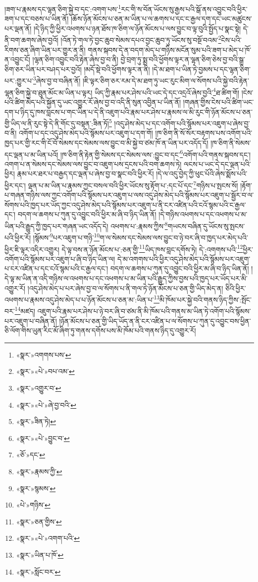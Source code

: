 །ཟག་པ་རྣམས་དང་ལྷན་ཅིག་སྐྱེ་བ་དང་:འགག་པས་\footnote{«སྣར་»འགགས་པས་}རང་གི་ས་བོན་ཡོངས་སུ་རྒྱས་པའི་སྒོ་ནས་འབྱུང་བའི་ཕྱིར་ཟག་པ་དང་བཅས་པ་ཡིན་ནོ། །ཆོས་ཉོན་མོངས་པ་ཅན་མ་ཡིན་པ་ལ་ཆགས་པ་དང་ང་རྒྱལ་དག་དང་ཡང་མཚུངས་པར་ལྡན་ནོ། །དེ་ཉིད་ཀྱི་ཕྱིར་འཕགས་པ་ཉན་ཐོས་ཁ་ཅིག་ལ་ཉོན་མོངས་པ་ལས་བྱུང་བ་ལྟ་བུའི་སྤྱོད་པ་སྣང་སྟེ། དེ་ནི་བག་ཆགས་ཞེས་བྱའོ། །འོན་ཏེ་གལ་ཏེ་བྱང་ཆུབ་སེམས་དཔའ་བྱང་ཆུབ་ཏུ་ཡོངས་སུ་བསྔོ་བའམ་\footnote{«སྣར་»«པེ་»བཔ་འམ་}ངེས་པའི་རིགས་ཅན་ཞིག་ཡིན་པར་གྱུར་ན་ནི། གནས་སྐབས་དེ་ན་བདག་མེད་པ་གཉིས་མངོན་སུམ་པའི་ཟག་པ་མེད་པ་ཁོ་ན་འབྱུང་ངོ། །ལྷན་ཅིག་འབྱུང་བའི་རྟེན་ཞེས་བྱ་བ་ནི། བྱེ་བྲག་ཏུ་སྨྲ་བའི་ཕྱོགས་ལྟར་ན་ལྷན་ཅིག་ཅེས་བྱ་བའི་སྒྲ་ཅིག་ཅར་ཡིན་པར་བཤད་པར་བྱའོ། །མདོ་སྡེ་བའི་ཕྱོགས་ལྟར་ན་ནི། །དེ་མ་ཐག་པ་ཡིན་ཏེ་བྱམས་པ་དང་ལྷན་ཅིག་པར་:གྱུར་པ་\footnote{«སྣར་»འགྱུར་བ་}ཞེས་བྱ་བ་བཞིན་ནོ། །ཇི་ལྟར་ཅིག་ཅར་རམ་དེ་མ་ཐག་ཏུ་ཡང་རུང་མིག་ལ་སོགས་པའི་སྐྱེ་བའི་རྟེན་ལྷན་ཅིག་སྐྱེ་བ་ཐུན་མོང་མ་ཡིན་པ་ལྟར། ཡིད་ཀྱི་རྣམ་པར་ཤེས་པའི་ཡང་དེ་དང་འདྲའོ་ཞེས་བྱའི་\footnote{«སྣར་»«པེ་»ཞེ་བྱ་བའི་}ཐ་ཚིག་གོ། །ངེས་པའི་ཚིག་མེད་པའི་སྐྱོན་དུ་ཡང་འགྱུར་རོ་ཞེས་བྱ་བ་འདི་ནི་སུན་འབྱིན་པ་ཡིན་ནོ། །གཞན་གྱིས་ངེས་པའི་ཚིག་ཡང་དག་པ་ཉིད་དུ་ཁས་བླངས་པ་གང་ཡིན་པ་དེ་ནི་འཇུག་པའི་རྣམ་པར་ཤེས་པ་རྣམས་ལ་མི་རུང་གི་ཉོན་མོངས་པ་ཅན་གྱི་ཡིད་ལ་ནི་རུང་སྟེ་དེ་ནི་གོང་དུ་བསྟན་:ཟིན་ཏོ།\footnote{«སྣར་»ཟིན་ཏེ།} །འདུ་ཤེས་མེད་པ་དང་འགོག་པའི་སྙོམས་པར་འཇུག་པ་ཞེས་བྱ་བ་ནི། འགོག་པ་དང་འདུ་ཤེས་མེད་པའི་སྙོམས་པར་འཇུག་པ་དག་གོ། །ཁ་ཅིག་ནི་སོ་སོར་བརྟགས་པས་འགོག་པའི་ཁྱད་པར་གྱི་རང་གི་ངོ་བོ་སེམས་དང་སེམས་ལས་བྱུང་བ་མི་སྐྱེ་བ་ཙམ་ཁོ་ན་ཡིན་པར་འདོད་དོ། །ཁ་ཅིག་ནི་སེམས་དང་ལྡན་པ་མ་ཡིན་པའོ། །ཁ་ཅིག་ནི་རྟེན་གྱི་སེམས་དང་སེམས་ལས་:བྱུང་བ་དང་\footnote{«སྣར་»«པེ་»བྱུང་བ་}འགོག་པའི་གནས་སྐབས་དང་། འགག་པ་ན་སེམས་དང་སེམས་ལས་བྱུང་བ་འཇུག་པས་དྲངས་པའི་བག་ཆགས་ཏེ། ལངས་པ་ཡང་དེ་དང་ལྡན་པའི་ཕྱིར། རྣམ་པར་ཐར་པ་བརྒྱད་དང་ལྡན་པ་ཞེས་བྱ་བ་སྣང་བའི་ཕྱིར་རོ། །དེ་ལ་འདུ་བྱེད་ཀྱི་ཕུང་པོའི་ཞེས་སྨོས་པའི་ཕྱིར་དང་། ལྡན་པ་མ་ཡིན་པ་རྣམས་ཀྱང་བསལ་བའི་ཕྱིར་ཡོངས་སུ་རྟོག་པ་:དང་པོ་དང་\footnote{«ཅོ་»དང་}གཉིས་པ་སྤངས་སོ། །རྟོག་པ་གཞན་གཉིས་ལས་ཀྱང་འགོག་པའི་སྙོམས་པར་འཇུག་པ་ལས་འདུ་ཤེས་མེད་པའི་སྙོམས་པར་འཇུག་པ་སྦྱོར་བ་ལ་སོགས་པའི་ཁྱད་པར་ཡོད་ཀྱང་འདུ་ཤེས་མེད་པའི་སྙོམས་པར་འཇུག་པ་ནི་ངར་འཛིན་པའི་ངའོ་སྙམ་པའི་ང་རྒྱལ་དང་། བདག་ལ་ཆགས་པ་ཀུན་དུ་འབྱུང་བའི་ཕྱིར་མ་ཞི་བ་ཉིད་ཡིན་ནོ། །དེ་གཉིས་འཕགས་པ་དང་འཕགས་པ་མ་ཡིན་པའི་རྒྱུད་ཀྱི་ཁྱད་པར་གཞན་ཡང་འདོད་དེ། འཕགས་པ་:རྣམས་ཀྱིས་\footnote{«སྣར་»རྣམས་ཀྱི་}གཡངས་བཞིན་དུ་ཡོངས་སུ་སྤངས་པའི་ཕྱིར་རོ། །སྙོམས་\footnote{«སྣར་»སྙམས་}པར་འཇུག་པ་གཉི་\footnote{«པེ་»གཉིས་}ག་ལ་སེམས་དང་སེམས་ལས་བྱུང་བ་ཉེ་བར་ཞི་བ་ཁྱད་པར་མེད་པའི་ཕྱིར་ཇི་ལྟར་འདིར་འགྱུར། དེ་ལྟ་བས་ན་ཉོན་མོངས་པ་:ཅན་གྱི་\footnote{«སྣར་»ཅན་གྱིས་}ཡིད་ཁས་བླང་དགོས་ཏེ། དེ་:འགགས་པའི་\footnote{«སྣར་»«པེ་»འགག་པའི་}ཕྱིར་འགོག་པའི་སྙོམས་པར་འཇུག་པ་ཞི་བ་ཉིད་ཡིན་ལ། དེ་མ་འགགས་པའི་ཕྱིར་འདུ་ཤེས་མེད་པའི་སྙོམས་པར་འཇུག་པ་ངར་འཛིན་པ་དང་ངའོ་སྙམ་པའི་ང་རྒྱལ་དང་། བདག་ལ་ཆགས་པ་ཀུན་དུ་འབྱུང་བའི་ཕྱིར་མ་ཞི་བ་ཉིད་ཡིན་ནོ། །དེ་ལྟ་མ་ཡིན་ན་འདི་གཉིས་ལ་འཕགས་པ་དང་འཕགས་པ་མ་ཡིན་པའི་རྒྱུད་ཀྱིས་བྱས་པའི་ཁྱད་པར་ཡོད་པར་མི་འགྱུར་རོ། །འདུ་ཤེས་མེད་པ་པར་ཞེས་བྱ་བ་ལ་སོགས་པ་ནི་གལ་ཏེ་ཉོན་མོངས་པ་ཅན་གྱི་ཡིད་མེད་ན། ཅིའི་ཕྱིར་འཕགས་པ་རྣམས་འདུ་ཤེས་མེད་པ་པ་ཉོན་མོངས་པ་ཅན་མ་:ཡིན་པ་\footnote{«སྣར་»ཡིན་པ་ཁོ་}མི་ཁོམ་པར་སྐྱེ་བའི་གནས་ཉིད་ཀྱིས་:སྤོང་བར་\footnote{«སྣར་»སློང་བར་}མཛད། འཇུག་པའི་རྣམ་པར་ཤེས་པ་ཉེ་བར་ཞི་བ་ཙམ་ནི་མི་ཁོམ་པའི་གནས་མ་ཡིན་ཏེ་འགོག་པའི་སྙོམས་པར་འཇུག་པ་བཞིན་ནོ། །ཉོན་མོངས་པ་ཅན་གྱི་ཡིད་ཡོད་ན་ནི་ངར་འཛིན་པ་ལ་སོགས་པ་ཀུན་དུ་འབྱུང་བས་ཕྱིན་ཅི་ལོག་གིས་ཡུན་རིང་མོ་ཞིག་ཏུ་གནས་དགོས་པས་མི་ཁོམ་པའི་གནས་ཉིད་དུ་འགྱུར་རོ། 